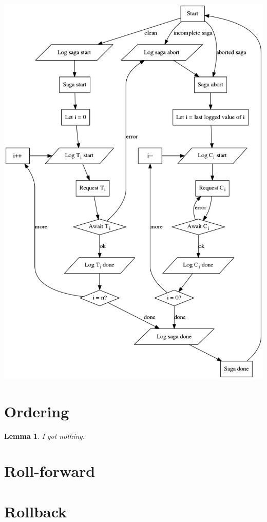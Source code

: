 \documentclass{article}
\newtheorem{lemma}{Lemma}[section]
\begin{document}
\includegraphics[width=\linewidth]{flow}

\section{Ordering}

\begin{lemma}
I got nothing.
\end{lemma}

\section{Roll-forward}

\section{Rollback}
\end{document}
